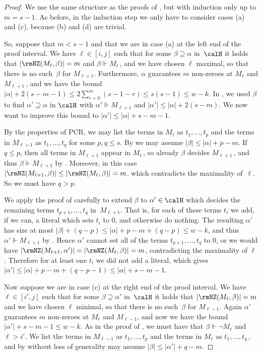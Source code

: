 \begin{proof}
We use the same structure as the proofs of 
,  %
but with induction only up to $m=s-1$. As before, in the induction step we only have to consider
cases (a) and (c), because (b) and (d) are trivial.

So, suppose that $m<s-1$ and that we are in case (a) at the left end 
of the proof interval. We have  $\ell \in [i,j]$ such that for some $\beta \supseteq \alpha$ in~$\calH$
it holds that $|\rmNZ(M_\ell, \beta)| = m$ and $\beta \Vdash M_\ell$\,,
and we have chosen $\ell$ maximal, so that there is no such~$\beta$ for $M_{\ell+1}$. 
Furthermore, $\alpha$ guarantees $m$ non-zeroes at $M_\ell$ and $M_{\ell+1}$\,, and
we have the bound
$|\alpha| + 2(s-m-1) \le 2 \sum_{r=0}^{m} (s-1-r) \le s(s-1) \le w - k$.
In , we used $\beta$ to find $\alpha' \supseteq \alpha$ in $\calH$
with $\alpha' \Vdash M_{\ell+1}$ and $|\alpha'| \le |\alpha|+2(s-m)$. 
We now want  to improve this bound to $|\alpha'| \le |\alpha|+s-m-1$.

By the properties of PCR, we may list the terms in $M_\ell$ as $t_1, \dots, t_p$
and the terms in $M_{\ell+1}$ as $t_1, \dots, t_q$ for some $p,q \le s$.
By  we may assume $|\beta| \le |\alpha|+p-m$.
If $q \le p$, then all terms in $M_{\ell+1}$ appear in $M_\ell$\,,
so already $\beta$ decides $M_{\ell+1}$\,, and thus 
$\beta \Vdash M_{\ell+1}$ by .
Moreover, in this case $|\rmNZ(M_{\ell+1}, \beta)| \le |\rmNZ(M_\ell, \beta)| = m$, 
which contradicts the maximality of~$\ell$. So we must have $q>p$.


We  apply the proof of   carefully
to extend $\beta$ to $\alpha' \in \calH$ which
decides the remaining terms $t_{p+1}, \dots, t_q$ in~$M_{\ell+1}$.
That is, for each of these terms $t_i$ we add, if we can, a literal which sets $t_i$ to $0$, and otherwise do nothing.
The resulting $\alpha'$
has size at most $|\beta| + (q-p) \le |\alpha|+ p-m + (q-p) \le w-k$, and thus $\alpha' \Vdash M_{\ell+1}$
by . Hence $\alpha'$
cannot set all of the terms $t_{p+1}, \dots, t_q$ to $0$, 
or we would have $|\rmNZ(M_{\ell+1}, \alpha')| = |\rmNZ(M_\ell, \beta)|=m$, 
contradicting the maximality of $\ell$.
Therefore for at least one $t_i$ we did not add a literal,
which gives $|\alpha'| \le |\alpha|+p-m + (q-p-1) \le |\alpha|+ s-m-1$.

Now suppose we are in case (c) at the right end of the proof interval.
We have  $\ell \in [i',j]$ such that for some $\beta \supseteq \alpha'$ in~$\calH$
it holds that $|\rmNZ(M_{\ell}, \beta)| = m$ 
and we have chosen $\ell$ minimal, so that there is no such~$\beta$ for $M_{\ell-1}$. 
Again $\alpha'$ guarantees $m$ non-zeroes at $M_\ell$ and $M_{\ell-1}$, and now
we have the bound
$|\alpha'| + s-m-1 \le w - k$.
As in the proof of , we must have 
that $\beta \Vdash \neg M_{\ell}$ and $\ell > i'$.
We list the terms in $M_{\ell-1}$ as $t_1, \dots, t_p$
and the terms in $M_{\ell}$ as $t_1, \dots, t_q$\,,
and by  without loss of generality may assume 
$|\beta| \le |\alpha'|+q-m$.


\end{proof}
